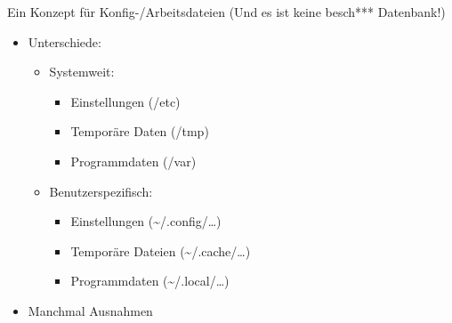 \begin{frame}{Ein Konzept für Konfig-/Arbeitsdateien \tiny (Und es ist keine besch*** Datenbank!)}
\begin{itemize}
\item Unterschiede:
	\begin{itemize}
	\item Systemweit:
		\begin{itemize}
		\item Einstellungen (/etc)
		\item Temporäre Daten (/tmp)
		\item Programmdaten (/var)
		\end{itemize}
	\item Benutzerspezifisch:
	\begin{itemize}
		\item Einstellungen (\textasciitilde/.config/…)
		\item Temporäre Dateien (\textasciitilde/.cache/…)
		\item Programmdaten (\textasciitilde/.local/…)	
	\end{itemize}
	\end{itemize}
\item Manchmal Ausnahmen
\end{itemize}
\end{frame}